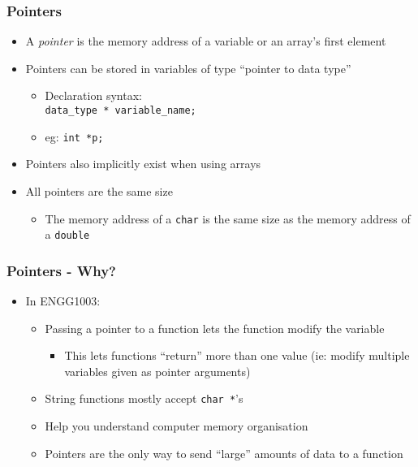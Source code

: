 \documentclass[14pt]{beamer}
\begin{document}
\begin{frame}
\frametitle{Pointers}
\begin{itemize}
\item A \textit{pointer} is the memory address of a variable or an array's first element
\item Pointers can be stored in variables of type ``pointer to data type''
	\begin{itemize}
		\item Declaration syntax:\\ \texttt{data\_type * variable\_name;}
		\item eg: \texttt{int *p;}
	\end{itemize}
\item Pointers also implicitly exist when using arrays
\item All pointers are the same size
	\begin{itemize}
		\item The memory address of a \texttt{char} is the same size as the memory address of a \texttt{double}
	\end{itemize}
\end{itemize}
\end{frame}

\begin{frame}
\frametitle{Pointers - Why?}
\begin{itemize}
\item In ENGG1003:
	\begin{itemize}
		\item Passing a pointer to a function lets the function modify the variable
		\begin{itemize}
		\item This lets functions ``return'' more than one value (ie: modify multiple variables given as pointer arguments)
		\end{itemize}
		\item String functions mostly accept \texttt{char *}'s
		\item Help you understand computer memory organisation
		\item Pointers are the only way to send ``large'' amounts of data to a function
	\end{itemize}
\end{itemize}
\end{frame}
\end{document}
